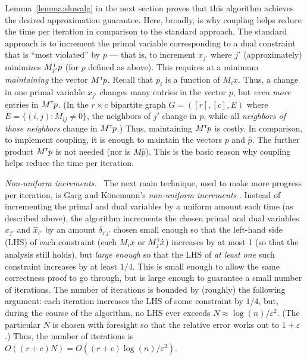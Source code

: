 \documentclass[11pt]{svjour3} \usepackage{fullpage}
\renewcommand{\paragraph}[1]{\smallskip\vspace{2pt}\par{\em #1}~}
\newcommand{\primalOf}[1]{{{#1}}}
\newcommand{\dualOf}[1]{{\hat{#1}}}
\newcommand{\xp}{\primalOf x}
\newcommand{\pp}{\primalOf p}
\newcommand{\xd}{\dualOf x}
\newcommand{\pd}{\dualOf p}
\newcommand{\eps}{\varepsilon}
\newcommand{\tran}{^{\scriptscriptstyle \sf T\hspace*{-0.05em}}}
\begin{document}
Lemma~\ref{lemma:slowalg} in the next section proves that this algorithm
achieves the desired approximation guarantee.
Here, broadly, is why coupling helps reduce the time per iteration
in comparison to the standard approach.
The standard approach is to increment the primal variable corresponding 
to a dual constraint that is ``most violated'' by $\pp$ ---
that is, to increment $\xp_{j'}$ where $j'$ (approximately) minimizes $M\tran_{j'}\pp$
(for $\pp$ defined as above).
This requires at a minimum {\em maintaining} the vector $M\tran\pp$.
Recall that $\pp_i$ is a function of $M_i \xp$.
Thus, a change in one primal variable $\xp_{j'}$ 
changes many entries in the vector $\pp$,
but {\em even more} entries in $M\tran\pp$.
(In the $r\times c$ bipartite graph $G=([r],[c],E)$ where $E=\{(i,j) : M_{ij} \neq 0\}$,
the neighbors of $j'$ change in $\pp$,
while all {\em neighbors of those neighbors} change in $M\tran\pp$.)
Thus, maintaining $M\tran\pp$ is costly.
In comparison, to implement coupling, it is enough to maintain the vectors $\pp$ and $\pd$.
The further product $M\tran\pp$ is not needed (nor is $M\pd$).
This is the basic reason why coupling helps reduce the time per iteration.

\paragraph{Non-uniform increments.}
The next main technique, used to make more progress per iteration,
is Garg and K\"onemann's {\em non-uniform increments} \cite{Garg98Faster,Konemann98Fast,garg2007faster}.
Instead of incrementing the primal and dual variables by a uniform amount each time (as described above), the algorithm increments the chosen primal and dual variables $\xp_{j'}$ and $\xd_{i'}$ by an amount $\delta_{i'j'}$ chosen small enough so that the left-hand side (LHS) of 
each constraint (each $M_i\xp$ or $M_j\tran\xd$) increases by at most 1 (so that the analysis still holds), but {\em large enough} so that the LHS of {\em at least one} such constraint increases by at least $1/4$.
This is small enough to allow the same correctness proof to go through, 
but is large enough to guarantee a small number of iterations.
The number of iterations is bounded by (roughly) the following argument:
each iteration increases the LHS of some constraint by $1/4$,
but, during the course of the algorithm, no LHS ever exceeds $N \approx \log(n)/\eps^2$.
(The particular $N$ is chosen with foresight so that the relative error works out to $1+\eps$.)
Thus, the number of iterations is $O((r+c)N) = O((r+c)\log(n)/\eps^2)$.
\end{document}
